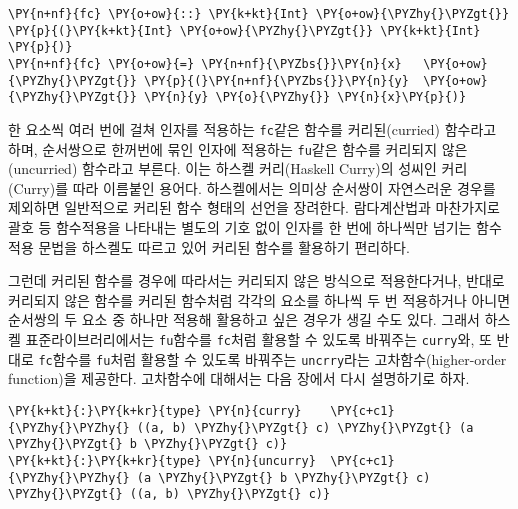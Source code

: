     \begin{tcolorbox}[breakable, size=fbox, boxrule=1pt, pad at break*=1mm,colback=cellbackground, colframe=cellborder, top=.75ex]
\begin{Verbatim}[commandchars=\\\{\}]
\PY{n+nf}{fc} \PY{o+ow}{::} \PY{k+kt}{Int} \PY{o+ow}{\PYZhy{}\PYZgt{}} \PY{p}{(}\PY{k+kt}{Int} \PY{o+ow}{\PYZhy{}\PYZgt{}} \PY{k+kt}{Int}  \PY{p}{)}
\PY{n+nf}{fc} \PY{o+ow}{=} \PY{n+nf}{\PYZbs{}}\PY{n}{x}   \PY{o+ow}{\PYZhy{}\PYZgt{}} \PY{p}{(}\PY{n+nf}{\PYZbs{}}\PY{n}{y}  \PY{o+ow}{\PYZhy{}\PYZgt{}} \PY{n}{y} \PY{o}{\PYZhy{}} \PY{n}{x}\PY{p}{)}
\end{Verbatim}
\end{tcolorbox}

    한 요소씩 여러 번에 걸쳐 인자를 적용하는 \texttt{fc}같은 함수를
커리된(curried) 함수라고 하며, 순서쌍으로 한꺼번에 묶인 인자에 적용하는
\texttt{fu}같은 함수를 커리되지 않은(uncurried) 함수라고 부른다. 이는
하스켈 커리(Haskell Curry)의 성씨인 커리(Curry)를 따라 이름붙인 용어다.
하스켈에서는 의미상 순서쌍이 자연스러운 경우를 제외하면 일반적으로
커리된 함수 형태의 선언을 장려한다. 람다계산법과 마찬가지로 괄호 등
함수적용을 나타내는 별도의 기호 없이 인자를 한 번에 하나씩만 넘기는
함수적용 문법을 하스켈도 따르고 있어 커리된 함수를 활용하기 편리하다.

그런데 커리된 함수를 경우에 따라서는 커리되지 않은 방식으로
적용한다거나, 반대로 커리되지 않은 함수를 커리된 함수처럼 각각의 요소를
하나씩 두 번 적용하거나 아니면 순서쌍의 두 요소 중 하나만 적용해
활용하고 싶은 경우가 생길 수도 있다. 그래서 하스켈 표준라이브러리에서는
\texttt{fu}함수를 \texttt{fc}처럼 활용할 수 있도록 바꿔주는
\texttt{curry}와, 또 반대로 \texttt{fc}함수를 \texttt{fu}처럼 활용할 수
있도록 바꿔주는 \texttt{uncrry}라는 고차함수(higher-order function)을
제공한다. 고차함수에 대해서는 다음 장에서 다시 설명하기로 하자.

    \begin{tcolorbox}[breakable, size=fbox, boxrule=1pt, pad at break*=1mm,colback=cellbackground, colframe=cellborder, top=.75ex]
\begin{Verbatim}[commandchars=\\\{\}]
\PY{k+kt}{:}\PY{k+kr}{type} \PY{n}{curry}    \PY{c+c1}{\PYZhy{}\PYZhy{} ((a, b) \PYZhy{}\PYZgt{} c) \PYZhy{}\PYZgt{} (a \PYZhy{}\PYZgt{} b \PYZhy{}\PYZgt{} c)}
\PY{k+kt}{:}\PY{k+kr}{type} \PY{n}{uncurry}  \PY{c+c1}{\PYZhy{}\PYZhy{} (a \PYZhy{}\PYZgt{} b \PYZhy{}\PYZgt{} c) \PYZhy{}\PYZgt{} ((a, b) \PYZhy{}\PYZgt{} c)}
\end{Verbatim}
\end{tcolorbox}

